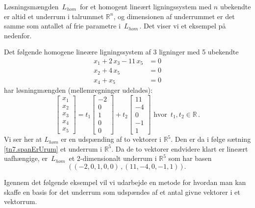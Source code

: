 Løsningsmængden $\,L_{hom}\,$ for et homogent lineært ligningssystem med $n$ ubekendte er altid et underrum i talrummet $\mathbb R^n$, og dimensionen af underrummet er det samme som antallet af frie parametre i $\,L_{hom}\,$. Det viser vi et eksempel på nedenfor. 

\begin{example}\label{tn7.lsnRum}
Det følgende homogene lineære ligningssystem af 3 ligninger med 5 ubekendte
\begin{align*}
x_1+2\,x_3-11\,x_5&=0\\
x_2+4\,x_5&=0\\
x_4+x_5&=0
\end{align*}
har løsningmængden (mellemregninger udelades):
\begin{equation}\label{tn7.lHom}
\left[ \begin{array}{r} x_1\\ x_2\\ x_3\\ x_4\\ x_5\end{array} \right]=
t_1\left[ \begin{array}{r} -2\\ 0\\ 1\\0\\ 0\end{array} \right]+t_2\left[ \begin{array}{r} 11\\ -4\\ 0\\-1\\ 1\end{array} \right]\,\,\mathrm{hvor}\, \,\,t_1,t_2\in\mathbb{R}\,.
\end{equation}
Vi ser her at $L_{hom}$ er en udspænding af to vektorer i $\mathbb R^5$. Den er da i følge sætning \ref{tn7.spanErUrum} et underrum i $\mathbb R^5$. Da de to vektorer endvidere klart er lineært uafhængige, er $\,L_{hom}\,$ et 2-dimensionalt underrum i $\mathbb R^5$ som har basen
$$
\big(\,(-2,0,1,0,0)\,,(11,-4,0,-1,1)\,\big )\,.
$$
\end{example}

Igennem det følgende eksempel vil vi udarbejde en metode for hvordan man kan skaffe en basis for det underrum som udspændes af et antal givne vektorer i et vektorrum.\\

